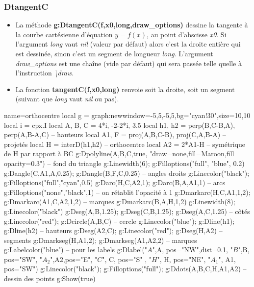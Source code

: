 \documentclass[%
10pt,%
a4paper,%
french,%
]%
{article}%
\newenvironment*{demo}[2][]{%
\gdef\legende{#2}%
\gdef\lab{#1}%
\bgroup
\VerbatimOut{\jobname.tmp}%
}%
{%
\endVerbatimOut%
\egroup%
\inputminted[ignorelexererrors=true,breaklines,bgcolor=Beige,linenos,numbersep=6pt,frame=single,fontsize=\footnotesize]{Lua}{\jobname.tmp}%
\begin{minipage}{0.9\textwidth}
\begin{center}
\captionof{figure}{\legende}\label{\lab}%
%
\end{center}
\end{minipage}
}
\begin{document}
\subsubsection{ DtangentC}
\begin{itemize}
    \item La méthode \textbf{g:DtangentC(f,x0,long,draw\_options)} dessine la tangente à la courbe cartésienne d'équation \(y=f(x)\), au point d'abscisse \emph{x0}. Si l'argument \emph{long} vaut \emph{nil} (valeur par défaut) alors c'est la droite entière qui est dessinée, sinon c'est un segment de longueur \emph{long}. L'argument \emph{draw\_options} est une chaîne (vide par défaut) qui sera passée telle quelle à l'instruction \emph{\textbackslash draw}.
    \item La fonction \textbf{tangentC(f,x0,long)} renvoie soit la droite, soit un segment (suivant que \emph{long} vaut \emph{nil} ou pas).
\end{itemize}
  

\begin{demo}{Symétrique de l'orthocentre}
\begin{luadraw}{name=orthocentre}
local g = graph:new{window={-5,5,-5,5},bg="cyan!30",size={10,10}}
local i = cpx.I
local A, B, C = 4*i, -2-2*i, 3.5
local h1, h2 = perp({B,C-B},A), perp({A,B-A},C) -- hauteurs
local A1, F = proj(A,{B,C-B}), proj(C,{A,B-A}) -- projetés
local H = interD(h1,h2) -- orthocentre
local A2 = 2*A1-H -- symétrique de H par rapport à BC
g:Dpolyline({A,B,C},true, "draw=none,fill=Maroon,fill opacity=0.3") -- fond du triangle
g:Linewidth(6); g:Filloptions("full", "blue", 0.2)
g:Dangle(C,A1,A,0.25); g:Dangle(B,F,C,0.25) -- angles droits
g:Linecolor("black"); g:Filloptions("full","cyan",0.5)
g:Darc(H,C,A2,1); g:Darc(B,A,A1,1) -- arcs
g:Filloptions("none","black",1) -- on rétablit l'opacité à 1
g:Dmarkarc(H,C,A1,1,2); g:Dmarkarc(A1,C,A2,1,2) -- marques
g:Dmarkarc(B,A,H,1,2)
g:Linewidth(8); g:Linecolor("black")
g:Dseg({A,B},1.25); g:Dseg({C,B},1.25); g:Dseg({A,C},1.25) -- côtés
g:Linecolor("red"); g:Dcircle(A,B,C) -- cercle
g:Linecolor("blue"); g:Dline(h1); g:Dline(h2) -- hauteurs
g:Dseg({A2,C}); g:Linecolor("red"); g:Dseg({H,A2}) -- segments
g:Dmarkseg(H,A1,2); g:Dmarkseg(A1,A2,2) -- marques
g:Labelcolor("blue") -- pour les labels
g:Dlabel("$A$",A, {pos="NW",dist=0.1}, "$B$",B, {pos="SW"}, "$A_2$",A2,{pos="E"}, "$C$", C, {pos="S" }, "$H$", H, {pos="NE"}, "$A_1$", A1, {pos="SW"})
g:Linecolor("black"); g:Filloptions("full"); g:Ddots({A,B,C,H,A1,A2}) -- dessin des points
g:Show(true)
\end{luadraw}
\end{demo}
\end{document}

